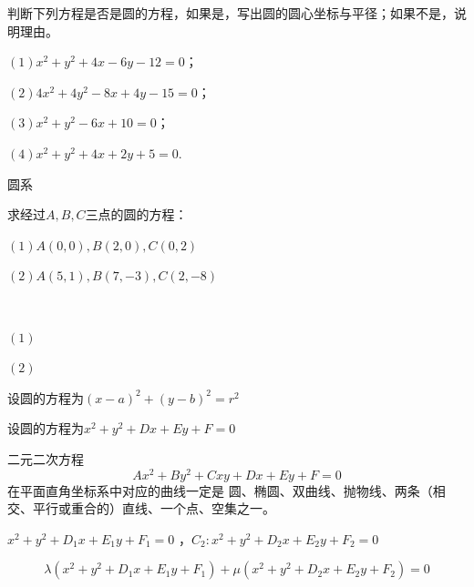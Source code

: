 \begin{example} 判断下列方程是否是圆的方程，如果是，写出圆的圆心坐标与平径；如果不是，说明理由。

    $(1)  x^{2}+y^{2}+4 x-6 y-12=0 $；

$(2)  4 x^{2}+4 y^{2}-8 x+4 y-15=0 $；

$(3)  x^{2}+y^{2}-6 x+10=0 $；

$(4)x^{2}+y^{2}+4x+2y+5=0$.
\end{example}
圆系

\begin{example}
    求经过\(A,B,C\)三点的圆的方程：

    \((1)A(0,0),B(2,0),C(0,2)\)

    \((2)A(5,1),B(7,-3),C(2,-8)\)
\end{example}
\begin{jie}
    \ 

    $(1)$

    \((2)\)
    \begin{way1}
        
    \end{way1}
    \begin{way2}
        设圆的方程为\((x-a)^2+(y-b)^2=r^2\)
    \end{way2}
    \begin{way3}
        设圆的方程为\(x^2+y^2+Dx+Ey+F=0\)
    \end{way3}
\end{jie}
\begin{theorem}
    二元二次方程\begin{equation}
        Ax^2+By^2+Cxy+Dx+Ey+F=0
    \end{equation}
    在平面直角坐标系中对应的曲线一定是
    圆、椭圆、双曲线、抛物线、两条（相交、平行或重合的）直线、一个点、空集之一。
\end{theorem}
\begin{theorem}
    $x^{2}+y^{2}+D_{1} x+E_{1} y+F_{1}=0$ ，$C_{2}: x^{2}+y^{2}+D_{2} x+E_{2} y+F_{2}=0$

    \begin{equation}
        \lambda(x^{2}+y^{2}+D_{1} x+E_{1} y+F_{1})+\mu(x^{2}+y^{2}+D_{2} x+E_{2} y+F_{2})=0
    \end{equation}
\end{theorem}
\clearpage
